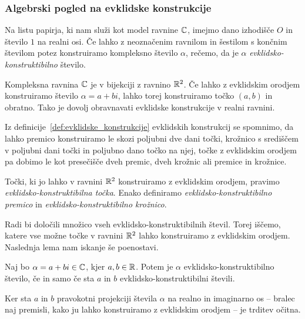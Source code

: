 \subsubsection{Algebrski pogled na evklidske konstrukcije}
\label{podpogl:evkl_konstruktibilnost}

\begin{definicija}
    \label{def:evkl_konstr}
    Na listu papirja, ki nam služi kot model ravnine $\mathbb C$, imejmo dano izhodišče $O$ in število $1$ na realni osi. Če lahko z neoznačenim ravnilom in šestilom s končnim številom potez konstruiramo kompleksno število $\alpha$, rečemo, da je $\alpha$ \emph{evklidsko-konstruktibilno} število.
\end{definicija}

Kompleksna ravnina $\mathbb C$ je v bijekciji z ravnino $\mathbb R^2$. Če lahko z evklidskim orodjem konstruiramo število $\alpha = a + bi$, lahko torej konstruiramo točko $(a, b)$ in obratno. Tako je dovolj obravnavati evklidske konstrukcije v realni ravnini.

Iz definicije~\ref{def:evklidske_konstrukcije} evklidskih konstrukcij se spomnimo, da lahko premico konstruiramo le skozi poljubni dve dani točki, krožnico s središčem v poljubni dani točki in poljubno dano točko na njej, točke z evklidskim orodjem pa dobimo le kot presečišče dveh premic, dveh krožnic ali premice in krožnice.

\begin{definicija}
    Točki, ki jo lahko v ravnini $\mathbb R^2$ konstruiramo z evklidskim orodjem, pravimo \emph{evklidsko-konstruktibilna točka}. Enako definiramo \emph{evklidsko-konstruktibilno premico} in \emph{evklidsko-konstruktibilno krožnico}.
\end{definicija}

Radi bi določili množico vseh evklidsko-konstruktibilnih števil. Torej iščemo, katere vse možne točke v ravnini $\mathbb R^2$ lahko konstruiramo z evklidskim orodjem. Naslednja lema nam iskanje še poenostavi.

\begin{lema}
    \label{trd:bijekcija_CR}
    Naj bo $\alpha = a+bi \in \mathbb C$, kjer $a, b \in \mathbb R$. Potem je $\alpha$ evklidsko-konstruktibilno število, če in samo če sta $a$ in $b$ evklidsko-konstruktibilni števili.
\end{lema}
\begin{dokaz}
    Ker sta $a$ in $b$ pravokotni projekciji števila $\alpha$ na realno in imaginarno os -- bralec naj premisli, kako ju lahko konstruiramo z evklidskim orodjem -- je trditev očitna.
\end{dokaz}


